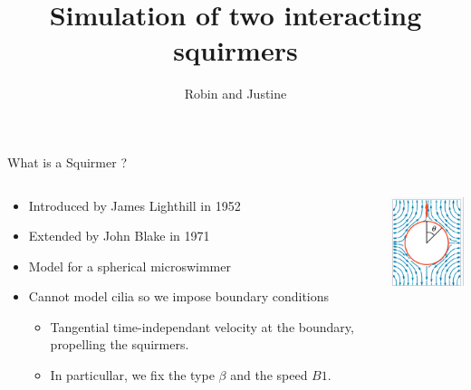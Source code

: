 \documentclass{beamer}
\title{Simulation of two interacting squirmers}
\author{Robin and Justine}
\institute{Supervised by: Van Landeghem Céline, Giraldi Laetitia}
\begin{document}
\begin{frame}
    \titlepage
\end{frame}

\begin{frame}{What is a Squirmer ?}
    \begin{columns}[T]
        \begin{column}{0.5\textwidth}
            \begin{itemize}
                \item Introduced by James Lighthill in 1952 \cite{Wikipedia}
                \item Extended by John Blake in 1971 \cite{Wikipedia}
                \item Model for a spherical microswimmer
                \item Cannot model cilia so we impose boundary conditions
                \begin{itemize}
                    \item Tangential time-independant velocity at the boundary, propelling the squirmers.
                    \item In particullar, we fix the type $\beta$ and the speed $B1$.
                \end{itemize}
            \end{itemize}
        \end{column}
        \begin{column}{0.5\textwidth}
            \centering
            \includegraphics[width=\textwidth]{../images/squirmer.png}
            \cite{Wikipedia}
        \end{column}
    \end{columns}
\end{frame}
\end{document}

